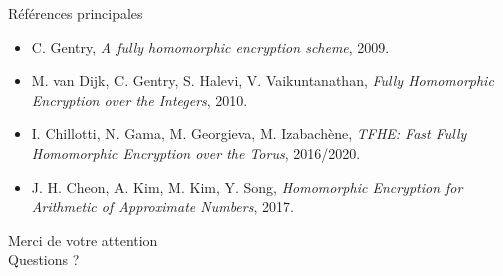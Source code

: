 \documentclass[10pt,aspectratio=169]{beamer}
\begin{document}
\begin{frame}{Références principales}
  \small
  \begin{itemize}
    \item C. Gentry, \textit{A fully homomorphic encryption scheme}, 2009.
    \item M. van Dijk, C. Gentry, S. Halevi, V. Vaikuntanathan, \textit{Fully Homomorphic Encryption over the Integers}, 2010.
    \item I. Chillotti, N. Gama, M. Georgieva, M. Izabachène, \textit{TFHE: Fast Fully Homomorphic Encryption over the Torus}, 2016/2020.
    \item J. H. Cheon, A. Kim, M. Kim, Y. Song, \textit{Homomorphic Encryption for Arithmetic of Approximate Numbers}, 2017.
  \end{itemize}
\end{frame}

\begin{frame}
  \centering
  \vspace{1cm}
  {\Huge Merci de votre attention}\\[1cm]
  {\large Questions ?}
\end{frame}
\end{document}
